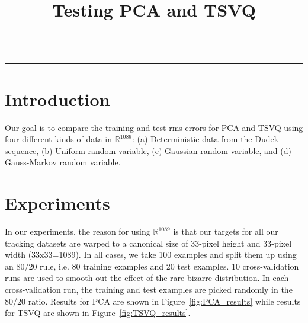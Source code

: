 
\title{Testing PCA and TSVQ}
\date{}

\maketitle
\rule[0pt]{\textwidth}{1pt}
\tableofcontents
\rule[0pt]{\textwidth}{1pt}

\section{Introduction}
Our goal is to compare the training and test rms errors for PCA and TSVQ using four different kinds of data in $\mathbb{R}^{1089}$: (a) Deterministic data from the Dudek sequence, (b) Uniform random variable, (c) Gaussian random variable, and (d) Gauss-Markov random variable.


\section{Experiments}
In our experiments, the reason for using $\mathbb{R}^{1089}$ is that our targets for all our tracking datasets are warped to a canonical size of 33-pixel height and 33-pixel width (33x33=1089).  In all cases, we take 100 examples and split them up using an 80/20 rule, i.e. 80 training examples and 20 test examples.  10 cross-validation runs are used to smooth out the effect of the rare bizarre distribution.  In each cross-validation run, the training and test examples are picked randomly in the 80/20 ratio.  Results for PCA are shown in Figure~\ref{fig:PCA_results} while results for TSVQ are shown in Figure~\ref{fig:TSVQ_results}.


